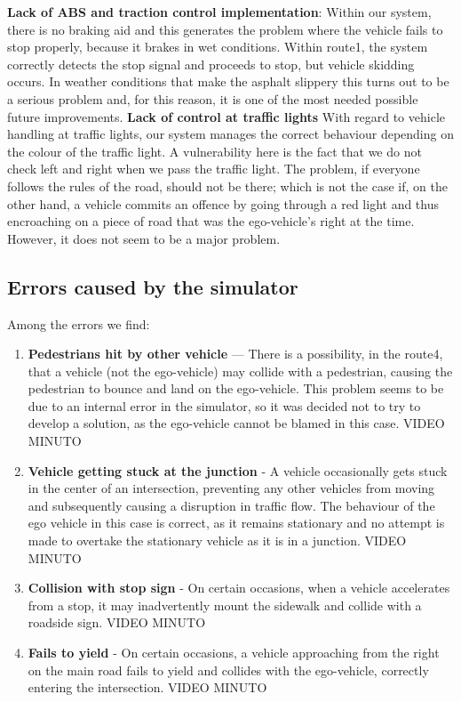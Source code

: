 \documentclass{article}
\begin{document}
\textbf{Lack of ABS and traction control implementation}\label{ABS}: Within our system, there is no braking aid and this generates the 
problem where the vehicle fails to stop properly, because it brakes in wet conditions. 
Within route1, the system correctly detects the stop signal and proceeds to stop, but vehicle skidding occurs.
In weather conditions that make the asphalt slippery this turns out to be a serious problem and, for this reason, it is one 
of the most needed possible future improvements.
\textbf{Lack of control at traffic lights}
With regard to vehicle handling at traffic lights, our system manages the correct behaviour depending on the colour of the 
traffic light. A vulnerability here is the fact that we do not check left and right when we pass the traffic light. The problem, 
if everyone follows the rules of the road, should not be there; which is not the case if, on the other hand, a vehicle commits 
an offence by going through a red light and thus encroaching on a piece of road that was the ego-vehicle's right at the time.
However, it does not seem to be a major problem.

\subsection{Errors caused by the simulator}
Among the errors we find:
\begin{enumerate}
    \item \textbf{Pedestrians hit by other vehicle} — There is a possibility, in the route4, that a vehicle (not the ego-vehicle) 
    may collide with a pedestrian, causing the pedestrian to bounce and land on the ego-vehicle. This problem seems to be due to 
    an internal error in the simulator, so it was decided not to try to develop a solution, as the ego-vehicle cannot be blamed 
    in this case. VIDEO MINUTO
    \item \textbf{Vehicle getting stuck at the junction} - A vehicle occasionally gets stuck in the center of an intersection, 
    preventing any other vehicles from moving and subsequently causing a disruption in traffic flow.
    The behaviour of the ego vehicle in this case is correct, as it remains stationary and no attempt is made to overtake the 
    stationary vehicle as it is in a junction. VIDEO MINUTO
    \item \textbf{Collision with stop sign} - On certain occasions, when a vehicle accelerates from a stop, it may inadvertently 
    mount the sidewalk and collide with a roadside sign. VIDEO MINUTO
    \item \textbf{Fails to yield} - On certain occasions, a vehicle approaching from the right on the main road fails to yield 
    and collides with the ego-vehicle, correctly entering the intersection. VIDEO MINUTO
\end{enumerate}
\end{document}
